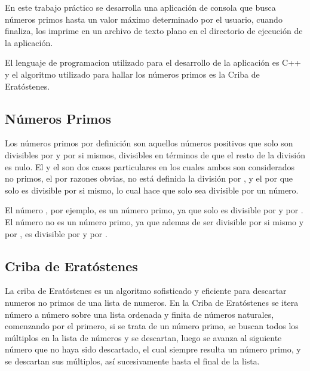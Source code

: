 \documentclass[12pt]{article}
\begin{document}
En este trabajo práctico se desarrolla una aplicación de consola que busca
números primos hasta un valor máximo determinado por el usuario, cuando
finaliza, los imprime en un archivo de texto plano en el directorio de ejecución
de la aplicación.

El lenguaje de programacion utilizado para el desarrollo de la aplicación es C++
y el algoritmo utilizado para hallar los números primos es la Criba de
Eratóstenes.

\subsection{Números Primos}

Los números primos por definición son aquellos números positivos que solo son
divisibles por  y por si mismos, divisibles en términos de que el resto
de la división es nulo. El  y el  son dos casos particulares en
los cuales ambos son considerados no primos, el  por razones obvias, no
está definida la división por , y el  por que solo es divisible
por si mismo, lo cual hace que solo sea divisible por un número.

El número , por ejemplo, es un número primo, ya que solo es divisible
por  y por . El número  no es un número primo, ya que
ademas de ser divisible por si mismo y por , es divisible por  y
por .

% 

\subsection{Criba de Eratóstenes}

La criba de Eratóstenes es un algoritmo sofisticado y eficiente para descartar
numeros no primos de una lista de numeros. En la Criba de Eratóstenes se itera
número a número sobre una lista ordenada y finita de números naturales,
comenzando por el primero, si se trata de un número primo, se buscan todos los
múltiplos en la lista de números y se descartan, luego se avanza al siguiente
número que no haya sido descartado, el cual siempre resulta un número primo, y
se descartan sus múltiplos, así sucesivamente hasta el final de la lista. 
\end{document}
